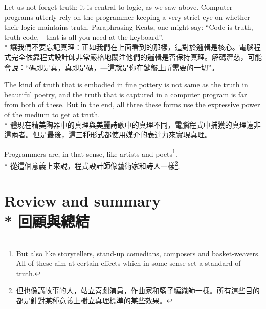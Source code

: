 \documentclass[]{article}
\begin{document}
{\color{gray}Let us not forget truth: it is central to logic, as we saw above. Computer programs utterly rely on the programmer keeping a very strict eye on whether their logic maintains truth. Paraphrasing Keats, one might say: ``Code is truth, truth code,---that is all you need at the keyboard''.}
\\*
{讓我們不要忘記真理：正如我們在上面看到的那樣，這對於邏輯是核心。電腦程式完全依靠程式設計師非常嚴格地關注他們的邏輯是否保持真理。解碼濟慈，可能會說：``碼即是真，真即是碼，---這就是你在鍵盤上所需要的一切''。}

{\color{gray}The kind of truth that is embodied in fine pottery is not same as the truth in beautiful poetry, and the truth that is captured in a computer program is far from both of these. But in the end, all three these forms use the expressive power of the medium to get at truth.}
\\*
{體現在精美陶器中的真理與美麗詩歌中的真理不同，電腦程式中捕獲的真理遠非這兩者。但是最後，這三種形式都使用媒介的表達力來實現真理。}

{\color{gray}Programmers are, in that sense, like artists and poets\footnote{{\color{gray}But also like storytellers, stand-up comedians, composers and basket-weavers. All of these aim at certain effects which in some sense set a standard of truth. }}.}
\\*
{從這個意義上來說，程式設計師像藝術家和詩人一樣\footnote{但也像講故事的人，站立喜劇演員，作曲家和籃子編織師一樣。所有這些目的都是針對某種意義上樹立真理標準的某些效果。}.}

\section*{{\color{gray}Review and summary}
\\*
{回顧與總結}}	
\end{document}
